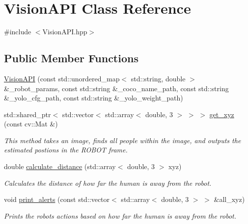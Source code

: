 \hypertarget{class_vision_a_p_i}{}\section{Vision\+A\+PI Class Reference}
\label{class_vision_a_p_i}


{\ttfamily \#include $<$Vision\+A\+P\+I.\+hpp$>$}

\subsection*{Public Member Functions}
\begin{DoxyCompactItemize}
\item 
\hyperlink{class_vision_a_p_i_afcf1ee4354678a29ef29852b8a2e13b5}{Vision\+A\+PI} (const std\+::unordered\+\_\+map$<$ std\+::string, double $>$ \&\+\_\+robot\+\_\+params, const std\+::string \&\+\_\+coco\+\_\+name\+\_\+path, const std\+::string \&\+\_\+yolo\+\_\+cfg\+\_\+path, const std\+::string \&\+\_\+yolo\+\_\+weight\+\_\+path)
\item 
std\+::shared\+\_\+ptr$<$ std\+::vector$<$ std\+::array$<$ double, 3 $>$ $>$ $>$ \hyperlink{class_vision_a_p_i_ab7a4230270a858147e81ced0707f6056}{get\+\_\+xyz} (const cv\+::\+Mat \&)
\begin{DoxyCompactList}\small\item\em This method takes an image, finds all people within the image, and outputs the estimated postions in the R\+O\+B\+OT frame. \end{DoxyCompactList}\item 
double \hyperlink{class_vision_a_p_i_a86585c063f61f943222eee3290040572}{calculate\+\_\+distance} (std\+::array$<$ double, 3 $>$ xyz)
\begin{DoxyCompactList}\small\item\em Calculates the distance of how far the human is away from the robot. \end{DoxyCompactList}\item 
void \hyperlink{class_vision_a_p_i_a67fb3aea734b0517548102bf757cc6ed}{print\+\_\+alerts} (const std\+::vector$<$ std\+::array$<$ double, 3 $>$ $>$ \&all\+\_\+xyz)
\begin{DoxyCompactList}\small\item\em Prints the robot\textquotesingle{}s actions based on how far the human is away from the robot. \end{DoxyCompactList}\end{DoxyCompactItemize}


